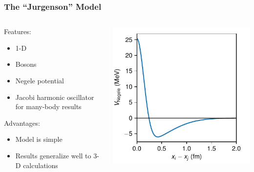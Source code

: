 \documentclass[accentcolor=tud2c,usenames,dvipsnames,colorbacktitle,inverttitle,landscape,german,presentation,t]{tudbeamer}
\begin{document}
  \begin{frame}
    \frametitle{The ``Jurgenson'' Model}
    \begin{columns}[c]
      \begin{column}{0.5\textwidth}
        Features:
        \begin{itemize}
          \item 1-D
          \item Bosons
          \item Negele potential
          \item Jacobi harmonic oscillator for many-body results
        \end{itemize}
        Advantages:
        \begin{itemize}
          \item Model is simple
          \item Results generalize well to 3-D calculations
        \end{itemize}
      \end{column}
      \begin{column}{0.5\textwidth}
        \includegraphics[width=\textwidth]{figures/05/negele_potential}
      \end{column}
    \end{columns}
  \end{frame}
\end{document}
